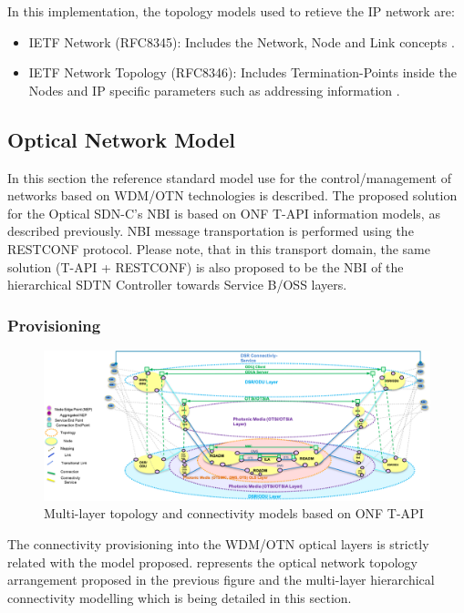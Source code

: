 \documentclass[a4paper,fleqn]{cas-dc}
\begin{document}
In this implementation, the topology models used to retieve the IP network are: 
\begin{itemize}
\item IETF Network (RFC8345): Includes the Network, Node and Link concepts \cite{clemm2018yang}.
\item IETF Network Topology (RFC8346): Includes Termination-Points inside the Nodes and IP specific parameters such as addressing information \cite{varga2018internet}.
\end{itemize}

\subsection{Optical Network Model}
\label{section:OPTmodels}

In this section the reference standard model use for the control/management of networks based on WDM/OTN technologies is described. The proposed solution for the Optical SDN-C's NBI is based on ONF T-API information models, as described previously.  NBI message transportation is performed using the RESTCONF protocol. Please note, that in this transport domain, the same solution (T-API + RESTCONF) is also proposed to be the NBI of the hierarchical SDTN Controller towards Service B/OSS layers.

\subsubsection{Provisioning}

\begin{figure}
	\centering
		\includegraphics[scale=0.75]{figs/ONF-T-API.png}
	\caption{Multi-layer topology and connectivity models based on ONF T-API}
	\label{FIG:ONF-T-API}
\end{figure}

The connectivity provisioning into the WDM/OTN optical layers is strictly related with the model proposed.  represents the optical network topology arrangement proposed in the previous figure and the multi-layer hierarchical connectivity modelling which is being detailed in this section.
\end{document}
